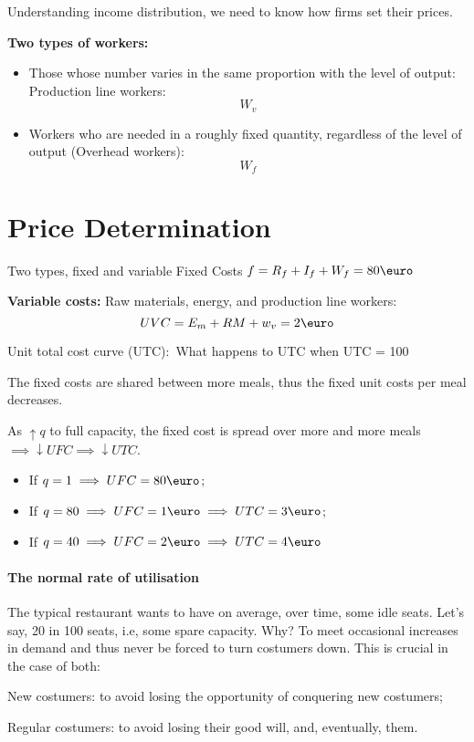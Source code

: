 \documentclass{report}
\begin{document}
Understanding income distribution, we need to know how firms set their prices. 

\textbf{Two types of workers:}
\begin{itemize}
	\item Those whose number varies in the same proportion with the level of output: Production line workers: $$W_v$$
	\item Workers who are needed in a roughly fixed quantity, regardless of the level of output (Overhead workers): $$W_f$$ 
\end{itemize}
\section{Price Determination}
Two types, fixed and variable
Fixed Costs $f = R_f + I_f + W_f = 80 \text{\euro}$

\textbf{Variable costs:} Raw materials, energy, and production line workers: $$UVC = E_m + RM + w_v =2 \text{\euro}$$

Unit total cost curve (UTC):\
What happens to UTC when UTC = 100

The fixed costs are shared between more meals, thus the fixed unit costs per meal decreases. 

As $\uparrow q$ to full capacity, the fixed cost is spread over more and more meals $\implies \downarrow UFC \implies \downarrow UTC$. 

\begin{itemize}
    \item If $q=1 \implies UFC=80\text{\euro}$;
    \item If $q=80 \implies UFC=1\text{\euro}\implies UTC=3\text{\euro}$;
    \item If $q=40 \implies UFC=2\text{\euro}\implies UTC=4\text{\euro}$
\end{itemize}


\paragraph{The normal rate of utilisation} 

The typical restaurant wants to have on average, over time, some idle seats. Let's say, 20 in 100 seats, i.e, some spare capacity. Why? To meet occasional increases in demand and thus never be forced to turn costumers down. This is crucial in the case of both: 

\begin{description}
    \item New costumers: to avoid losing the opportunity of conquering new costumers; 
    \item Regular costumers: to avoid losing their good will, and, eventually, them.
\end{description}
\end{document}
